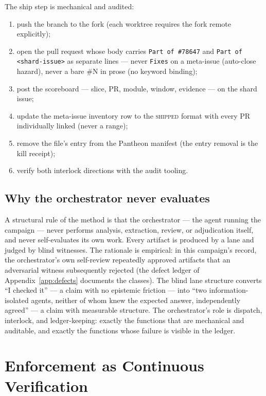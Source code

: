 \documentclass[11pt]{article}
\theoremstyle{definition}
\theoremstyle{plain}
\theoremstyle{remark}
\begin{document}
The ship step is mechanical and audited:
\begin{enumerate}[leftmargin=*]
\item push the branch to the fork (each worktree requires the fork remote
  explicitly);
\item open the pull request whose body carries \texttt{Part of \#78647} and
  \texttt{Part of <shard-issue>} as separate lines --- never \texttt{Fixes}
  on a meta-issue (auto-close hazard), never a bare \#N in prose (no keyword
  binding);
\item post the scoreboard --- slice, PR, module, window, evidence --- on the
  shard issue;
\item update the meta-issue inventory row to the \textsc{shipped} format
  with every PR individually linked (never a range);
\item remove the file's entry from the Pantheon manifest (the entry removal
  is the kill receipt);
\item verify both interlock directions with the audit tooling.
\end{enumerate}

\subsection{Why the orchestrator never evaluates}

A structural rule of the method is that the orchestrator --- the agent
running the campaign --- never performs analysis, extraction, review, or
adjudication itself, and never self-evaluates its own work. Every artifact
is produced by a lane and judged by blind witnesses. The rationale is
empirical: in this campaign's record, the orchestrator's own self-review
repeatedly approved artifacts that an adversarial witness subsequently
rejected (the defect ledger of Appendix~\ref{app:defects} documents the
classes). The blind lane structure converts ``I checked it'' --- a claim
with no epistemic friction --- into ``two information-isolated agents,
neither of whom knew the expected answer, independently agreed'' --- a claim
with measurable structure. The orchestrator's role is dispatch, interlock,
and ledger-keeping: exactly the functions that are mechanical and auditable,
and exactly the functions whose failure is visible in the ledger.

\section{Enforcement as Continuous Verification}
\label{sec:kag-enforcement}
\end{document}
